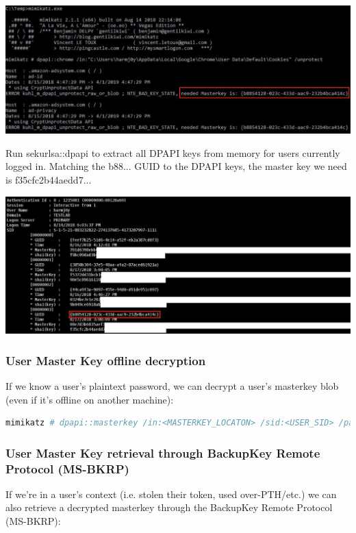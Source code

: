 \begin{center}
    \includegraphics[width=\textwidth]{resources/11-user-master-key-extraction-from-lsass.png}
\end{center}

Run sekurlsa::dpapi to extract all DPAPI keys from memory for users currently logged in.
Matching the {b88...} GUID to the DPAPI keys, the master key we need is
f35cfc2b44aedd7...

\begin{center}
    \includegraphics[width=\textwidth]{resources/11-user-master-key-extraction-from-lsass-2.png}
\end{center}

\subsubsection*{User Master Key offline decryption}
If we know a user's plaintext password, we can decrypt a user's masterkey blob (even if it's offline on another machine):

\begin{lstlisting}[language=sh]
mimikatz # dpapi::masterkey /in:<MASTERKEY_LOCATON> /sid:<USER_SID> /password:<USER_PLAINTEXT> /protected
\end{lstlisting}

\subsubsection*{User Master Key retrieval through BackupKey Remote Protocol (MS-BKRP)}
If we're in a user's context (i.e. stolen their token, used over-PTH/etc.) we can also retrieve a decrypted masterkey through the BackupKey Remote Protocol (MS-BKRP):

